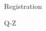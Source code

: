 \documentclass{article}
\newcommand{\room}[1]{
    \noindent
    #1
    \vspace{.2in}

}
\begin{document}
\rssheader[2in]

\vfill

\begin{center}
    \rsshuge
    \room{Registration}
    \room{Q-Z}
\end{center}

\vfill
\end{document}
